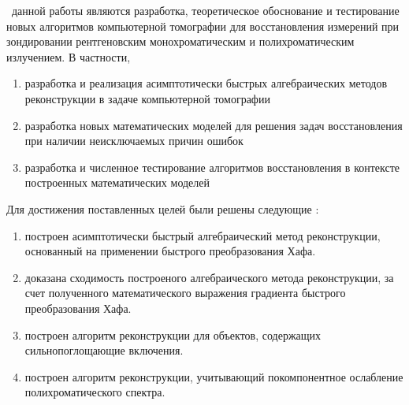 \begin{comment}
Отсутствие учета специфики проводимых исследований --- не единственная причина возникновения артефактов. 
Неточности, порождающие ошибки обработки, появляются на каждом этапе формирования картны измерений: аппаратная часть, восстановление и интерпретация полученных результатов.
Ошибки аппаратной части появляются в физической калибровке измерительной аппаратуры, калибровке геометрического расположения элементов в измерительной схеме, а так же при формировании входного сигнала для алгоритмов восстановления. 
К первым можно отнести ошибку в величине суммарной интенсивности излучения источника, в результате чего восстановленная картина может получиться ``пересвеченной''.
Примером второй причины может служить экспериментальная схема, в которой ось вращения объекта смещена относительно оси ``источник-детектор''.
Наконец, к погрешностям, вносимым аппаратурой, можно отнести шумы матрицы детектора, или наоборот, пересвечивание пикселей детектора.
На этапе алгоритмов восстановления могут быть внесены ошбики, связанные с вычислительной точностью программного обеспечения, сходимостью оптимизационных процедур (локальный минимум, недостижение минимума), слишком агрессивной регуляризацией. 
Последняя возможная причина состоит из ошибок визуализации трехмерных восстановленных картин и неправильной их интерпретации.
\end{comment}

{\aim} ~данной работы являются разработка, теоретическое обоснование и тестирование  новых алгоритмов компьютерной томографии для восстановления измерений при зондировании рентгеновским монохроматическим и полихроматическим излучением. В частности, 
\begin{enumerate}
\item разработка и реализация асимптотически быстрых алгебраических методов реконструкции в задаче компьютерной томографии
\item разработка новых математических моделей для решения задач восстановления при наличии неисключаемых причин ошибок
\item разработка и численное тестирование алгоритмов восстановления в контексте построенных математических моделей
\end{enumerate}

Для достижения поставленных целей были решены следующие {\tasks}:
\begin{enumerate}
  \item построен асимптотически быстрый алгебраический метод реконструкции, основанный на применении быстрого преобразования Хафа.
  \item доказана сходимость построеного алгебраического метода реконструкции, за счет полученного математического выражения градиента быстрого преобразования Хафа.
  \item построен алгоритм реконструкции для объектов, содержащих сильнопоглощающие включения.
  \item построен алгоритм реконструкции, учитывающий покомпонентное ослабление полихроматического спектра.
\end{enumerate}

